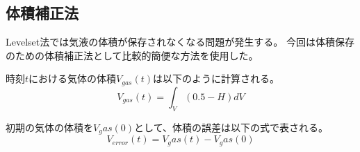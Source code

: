 \begin{comment}
別の文献の式だとこのように書かれているが上と同じはず。
\begin{equation}
	\frac{1}{\Delta \tau}\left\langle\left(\phi^{n+1}-\phi^n\right), w\right\rangle-\frac{1}{2}\left\langle\nabla w,\left(\phi^{n+1}+\phi^n\right) \mathbf{n}_{\Gamma}\right\rangle+\left\langle\phi^{n+1} \phi^n \mathbf{n}_{\Gamma}, \nabla w\right\rangle +\frac{\varepsilon}{2}\left\langle\left(\nabla \phi^{n+1}+\nabla \phi^n\right) \cdot \mathbf{n}_{\Gamma}, \nabla w \cdot \mathbf{n}_{\Gamma}\right\rangle=0
\end{equation}

時間ステップは、
\begin{equation}
	\Delta \tau = \Delta x^{1+d} \beta
\end{equation}

インターフェース厚さは、
\begin{equation}
	\epsilon = \Delta x^{1-d} \beta
\end{equation}
ここで変数$\beta$は$0.5$が基本だが、気泡の問題などには薄い界面として0.5より小さい値を用いることも許容する。

式(\ref{CLSM-weakform})をマトリクス形式に変形すると

\subsubsection{高精度保存型レベルセット関数}
CLS関数ではレベルセット法の長所であった界面法線ベクトルや曲率の精度が低下する\cite{Nakazawa2023}
そこでAccurate Conservative LevelSet法(ACLS法)では関数から符号付距離関数$\phi$を再構築し、法線ベクトルや曲率を評価する方法である。
\end{comment}
\subsection{体積補正法}

Levelset法では気液の体積が保存されなくなる問題が発生する。
今回は体積保存のための体積補正法として比較的簡便な方法を使用した。

時刻$t$における気体の体積$V_{gas}(t)$は以下のように計算される。
\begin{equation}
	V_{gas} (t) = \int_{V} (0.5 - H) dV
\end{equation}

初期の気体の体積を$V_gas(0)$として、体積の誤差は以下の式で表される。
\begin{equation}
	V_{error} (t) = V_gas(t) - V_gas(0)
\end{equation}

